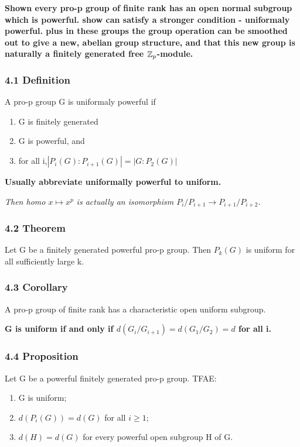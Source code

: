 \textbf{ Shown every pro-p group of finite rank has an open normal subgroup which is powerful. show can satisfy a stronger condition - uniformaly powerful. plus in these groups the group operation can be smoothed out to give a new, abelian group structure, and that this new group is naturally a finitely generated free $\mathbb Z_p$-module.}

\subsubsection*{4.1 Definition}
A pro-p group G is uniformaly powerful if
\begin{enumerate}
\item G is finitely generated
\item G is powerful, and
\item for all i,$|P_i(G):P_{i+1}(G)|  = |G:P_2(G)|$
\end{enumerate}


\textbf{Usually abbreviate uniformally powerful to uniform.}

\emph{Then homo $x\mapsto x^p$ is actually an isomorphism $P_i / P_{i+1} \rightarrow P_{i+1} / P_{i+2}$.}

\subsubsection*{4.2 Theorem}
Let G be a finitely generated powerful pro-p group. Then $P_k(G)$ is uniform for all sufficiently large k.

\subsubsection*{4.3 Corollary}
A pro-p group of finite rank has a characteristic open uniform subgroup.

\textbf{ G is uniform if and only if $d(G_i / G_{i+1}) = d(G_1 / G_2) = d$ for all i.}

\subsubsection*{4.4 Proposition}
Let G be a powerful finitely generated pro-p group. TFAE:
\begin{enumerate}
\item G is uniform;
\item $d(P_i(G)) = d(G)$ for all $i\geq 1$;
\item $d(H) = d(G)$ for every powerful open subgroup H of G.
\end{enumerate}

